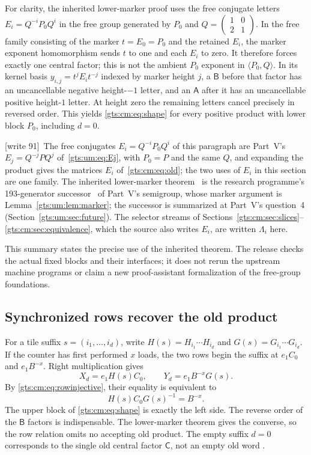 \documentclass[11pt,letterpaper]{article}
\theoremstyle{definition}
\theoremstyle{remark}
\newcommand{\wtagd}{\textup{[write 91]}}
\begin{document}
For clarity, the inherited lower-marker proof \cite{cm-directed} uses the free conjugate letters $E_i=Q^{-i}P_0Q^i$ in the free group generated by $P_0$ and $Q=\left(\begin{smallmatrix}1&0\\2&1\end{smallmatrix}\right)$. In the free family consisting of the marker $t=E_0=P_0$ and the retained $E_i$, the marker exponent homomorphism sends $t$ to one and each $E_i$ to zero. It therefore forces exactly one central factor; this is not the ambient $P_0$ exponent in $\langle P_0,Q\rangle$. In its kernel basis $y_{i,j}=t^jE_it^{-j}$ indexed by marker height $j$, a $\mathsf B$ before that factor has an uncancellable negative height-$-1$ letter, and an $\mathsf A$ after it has an uncancellable positive height-$1$ letter. At height zero the remaining letters cancel precisely in reversed order. This yields \eqref{gts:cm:eq:shape} for every positive product with lower block $P_0$, including $d=0$.

\wtagd\ The free conjugates $E_i=Q^{-i}P_0Q^i$ of this paragraph are Part~V's $E_j=Q^{-j}PQ^j$ of~\eqref{gts:um:eq:Ej}, with $P_0=P$ and the same $Q$, and expanding the product gives the matrices $E_i$ of~\eqref{gts:cm:eq:old}; the two uses of $E_i$ in this section are one family. The inherited lower-marker theorem~\cite{cm-directed} is the research programme's 193-generator successor~\cite{repo-ds193} of Part~V's semigroup, whose marker argument is Lemma~\ref{gts:um:lem:marker}; the successor is summarized at Part~V's question~4 (Section~\ref{gts:um:sec:future}). The selector streams of Sections~\ref{gts:cm:sec:slices}--\ref{gts:cm:sec:equivalence}, which the source also writes $E_i$, are written $\Lambda_i$ here.

This summary states the precise use of the inherited theorem. The release checks the actual fixed blocks and their interfaces; it does not rerun the upstream machine programs or claim a new proof-assistant formalization of the free-group foundations.

\subsection{Synchronized rows recover the old product}
For a tile suffix $s=(i_1,\ldots,i_d)$, write $H(s)=H_{i_1}\cdots H_{i_d}$ and $G(s)=G_{i_1}\cdots G_{i_d}$. If the counter has first performed $x$ loads, the two rows begin the suffix at $e_1C_0$ and $e_1B^{-x}$. Right multiplication gives
\[
 X_d=e_1H(s)C_0,\qquad Y_d=e_1B^{-x}G(s).
\]
By \eqref{gts:cm:eq:rowinjective}, their equality is equivalent to
\begin{equation}\label{gts:cm:eq:sync}
 H(s)C_0G(s)^{-1}=B^{-x}.
\end{equation}
The upper block of \eqref{gts:cm:eq:shape} is exactly the left side. The reverse order of the $\mathsf B$ factors is indispensable. The lower-marker theorem gives the converse, so the row relation omits no accepting old product. The empty suffix $d=0$ corresponds to the single old central factor $\mathsf C$, not an empty old word \cite{cm-synchronized,cm-countdown}.
\end{document}
